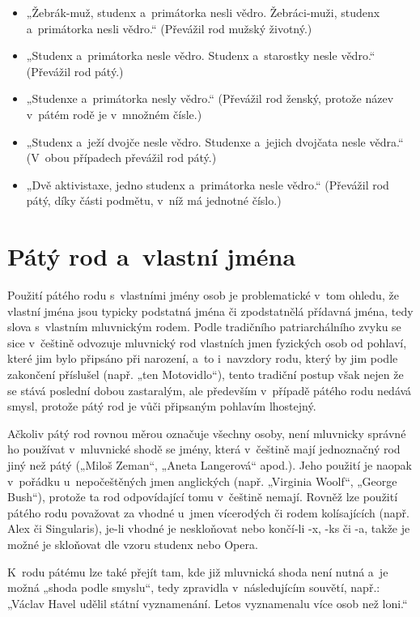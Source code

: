 \begin{itemize}
\item „Žebrák-muž, studenx a primátorka nesli vědro. Žebráci-muži, studenx a primátorka nesli vědro.“ (Převážil rod mužský životný.)
\item „Studenx a primátorka nesle vědro. Studenx a starostky nesle vědro.“ (Převážil rod pátý.)
\item „Studenxe a primátorka nesly vědro.“ (Převážil rod ženský, protože název v pátém rodě je v množném čísle.)
\item „Studenx a ježí dvojče nesle vědro. Studenxe a jejich dvojčata nesle vědra.“ (V obou případech převážil rod pátý.)
\item „Dvě aktivistaxe, jedno studenx a primátorka nesle vědro.“ (Převážil rod pátý, díky části podmětu, v níž má jednotné číslo.)
\end{itemize}

\section{Pátý rod a vlastní jména}

Použití pátého rodu s vlastními jmény osob je problematické v tom ohledu,
že vlastní jména jsou typicky podstatná jména či zpodstatnělá přídavná jména,
tedy slova s vlastním mluvnickým rodem. Podle tradičního patriarchálního zvyku
se sice v češtině odvozuje mluvnický rod vlastních jmen fyzických osob od pohlaví,
které jim bylo připsáno při narození, a to i navzdory rodu, který by jim
podle zakončení příslušel (např. „ten Motovidlo“), tento tradiční postup však
nejen že se stává poslední dobou zastaralým, ale především v případě pátého rodu
nedává smysl, protože pátý rod je vůči připsaným pohlavím lhostejný.

Ačkoliv pátý rod rovnou měrou označuje všechny osoby, není mluvnicky správné
ho používat v mluvnické shodě se jmény, která v češtině mají jednoznačný rod
jiný než pátý („Miloš Zeman“, „Aneta Langerová“ apod.).
Jeho použití je naopak v pořádku u nepočeštěných jmen anglických
(např. „Virginia Woolf“, „George Bush“), protože ta rod odpovídající
tomu v češtině nemají. Rovněž lze použití pátého rodu považovat za vhodné
u jmen vícerodých či rodem kolísajících (např. Alex či Singularis),
je-li vhodné je neskloňovat nebo končí-li -x, -ks či -a, takže je možné
je skloňovat dle vzoru studenx nebo Opera.

K rodu pátému lze také přejít tam, kde již mluvnická shoda není nutná
a je možná „shoda podle smyslu“, tedy zpravidla v následujícím souvětí, např.:
„Václav Havel udělil státní vyznamenání. Letos vyznamenalu více osob než loni.“

